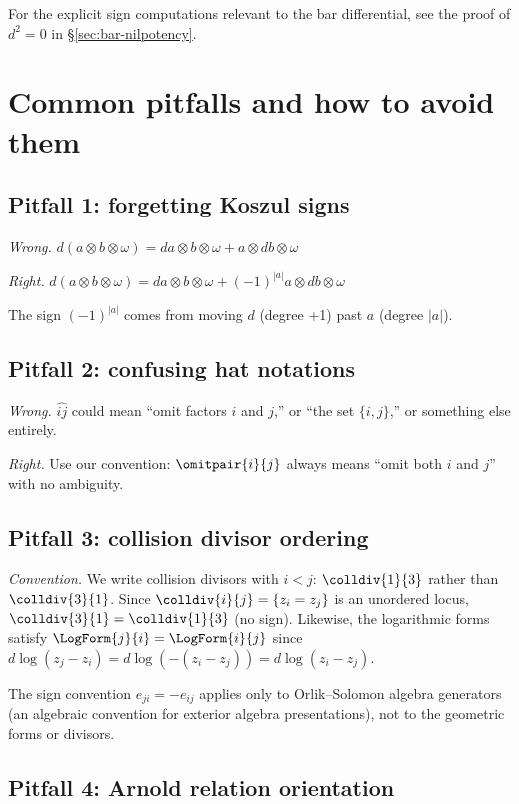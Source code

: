 For the explicit sign computations relevant to the bar differential, see the proof of $d^2 = 0$ in \S\ref{sec:bar-nilpotency}.

\section{Common pitfalls and how to avoid them}

\subsection{Pitfall 1: forgetting Koszul signs}

\emph{Wrong.} $d(a \otimes b \otimes \omega) = da \otimes b \otimes \omega + a \otimes db \otimes \omega$

\emph{Right.} $d(a \otimes b \otimes \omega) = da \otimes b \otimes \omega + (-1)^{|a|} a \otimes db \otimes \omega$

The sign $(-1)^{|a|}$ comes from moving $d$ (degree +1) past $a$ (degree $|a|$).

\subsection{Pitfall 2: confusing hat notations}

\emph{Wrong.} $\widehat{ij}$ could mean ``omit factors $i$ and $j$,'' or ``the set $\{i, j\}$,'' or something else entirely.

\emph{Right.} Use our convention: $\omitpair{i}{j}$ always means ``omit both $i$ and $j$'' with no ambiguity.

\subsection{Pitfall 3: collision divisor ordering}

\emph{Convention.} We write collision divisors with $i < j$: $\colldiv{1}{3}$ rather than $\colldiv{3}{1}$.  Since $\colldiv{i}{j} = \{z_i = z_j\}$ is an unordered locus, $\colldiv{3}{1} = \colldiv{1}{3}$ (no sign).  Likewise, the logarithmic forms satisfy $\LogForm{j}{i} = \LogForm{i}{j}$ since $d\log(z_j - z_i) = d\log(-(z_i - z_j)) = d\log(z_i - z_j)$.

The sign convention $e_{ji} = -e_{ij}$ applies only to Orlik--Solomon algebra generators (an algebraic convention for exterior algebra presentations), not to the geometric forms or divisors.

\subsection{Pitfall 4: Arnold relation orientation}

